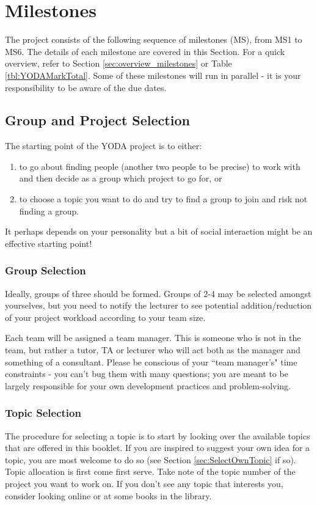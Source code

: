 \section{Milestones}
\label{sec:milestones}
The project consists of the following sequence of milestones (MS), from MS1 to MS6. The details of each milestone are covered in this Section. For a quick overview, refer to Section \ref{sec:overview_milestones} or Table \ref{tbl:YODAMarkTotal}. Some of these milestones will run in parallel - it is your responsibility to be aware of the due dates.

\subsection{Group and Project Selection}
\label{ms:teamupdate}
The starting point of the YODA project is to either: 
\begin{enumerate}
    \item to go about finding people (another two people to be precise) to work with and then decide as a group which project to go for, or
    \item to choose a topic you want to do and try to find a group to join and risk not finding a group.
\end{enumerate}

It perhaps depends on your personality but a bit of social interaction might be an effective starting point!


\subsubsection{Group Selection} 
Ideally, groups of three should be formed. Groups of 2-4 may be selected amongst yourselves, but you need to notify the lecturer to see potential addition/reduction of your project workload according to your team size.

Each team will be assigned a team manager. This is someone who is not in the team, but rather a tutor, TA or lecturer who will act both as the manager and something of a consultant. Please be conscious of your ``team manager's" time constraints - you can't bug them with many questions; you are meant to be largely responsible for your own development practices and problem-solving.

\subsubsection{Topic Selection}
The procedure for selecting a topic is to start by looking over the available topics that are offered in this booklet. If you are inspired to suggest your own idea for a topic, you are most welcome to do so (see Section \ref{sec:SelectOwnTopic} if so). Topic allocation is first come first serve. Take note of the topic number of the project you want to work on. If you don't see any topic that interests you, consider looking online or at some books in the library.

